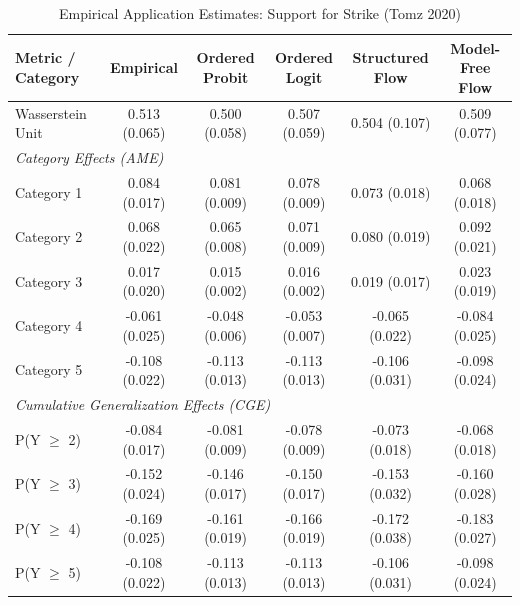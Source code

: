 \begin{table}[htbp]
\centering
\caption{Empirical Application Estimates: Support for Strike (Tomz 2020)}
\label{tab:table_tomz_empirical}
\small
\begin{tabular}{lccccc}
\toprule
\textbf{Metric / Category} & \textbf{Empirical} & \textbf{Ordered Probit} & \textbf{Ordered Logit} & \textbf{Structured Flow} & \textbf{Model-Free Flow} \\
\midrule
Wasserstein Unit & 0.513 (0.065) & 0.500 (0.058) & 0.507 (0.059) & 0.504 (0.107) & 0.509 (0.077) \\
\midrule
\multicolumn{6}{l}{\textit{Category Effects (AME)}} \\
  Category 1 & 0.084 (0.017) & 0.081 (0.009) & 0.078 (0.009) & 0.073 (0.018) & 0.068 (0.018) \\
  Category 2 & 0.068 (0.022) & 0.065 (0.008) & 0.071 (0.009) & 0.080 (0.019) & 0.092 (0.021) \\
  Category 3 & 0.017 (0.020) & 0.015 (0.002) & 0.016 (0.002) & 0.019 (0.017) & 0.023 (0.019) \\
  Category 4 & -0.061 (0.025) & -0.048 (0.006) & -0.053 (0.007) & -0.065 (0.022) & -0.084 (0.025) \\
  Category 5 & -0.108 (0.022) & -0.113 (0.013) & -0.113 (0.013) & -0.106 (0.031) & -0.098 (0.024) \\
\midrule
\multicolumn{6}{l}{\textit{Cumulative Generalization Effects (CGE)}} \\
  P(Y $\ge$ 2) & -0.084 (0.017) & -0.081 (0.009) & -0.078 (0.009) & -0.073 (0.018) & -0.068 (0.018) \\
  P(Y $\ge$ 3) & -0.152 (0.024) & -0.146 (0.017) & -0.150 (0.017) & -0.153 (0.032) & -0.160 (0.028) \\
  P(Y $\ge$ 4) & -0.169 (0.025) & -0.161 (0.019) & -0.166 (0.019) & -0.172 (0.038) & -0.183 (0.027) \\
  P(Y $\ge$ 5) & -0.108 (0.022) & -0.113 (0.013) & -0.113 (0.013) & -0.106 (0.031) & -0.098 (0.024) \\
\bottomrule
\end{tabular}
\end{table}
